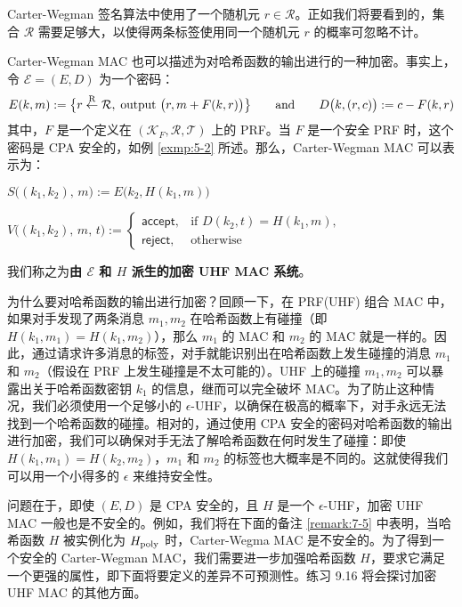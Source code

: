 Carter-Wegman 签名算法中使用了一个随机元 $r\in\mathcal{R}$。正如我们将要看到的，集合 $\mathcal{R}$ 需要足够大，以使得两条标签使用同一个随机元 $r$ 的概率可忽略不计。

\begin{snote}
Carter-Wegman MAC 也可以描述为对哈希函数的输出进行的一种加密。事实上，令 $\mathcal{E}=(E,D)$ 为一个密码：
\[
E(k,m):=\big\{r\overset{\rm R}\leftarrow\mathcal{R},\;\text{output }\big(r,m+F(k,r)\big)\big\}
\quad\quad\text{and}\quad\quad
D\big(k,(r,c)\big):=c-F(k,r)
\]
其中，$F$ 是一个定义在 $(\mathcal{K}_F,\mathcal{R},\mathcal{T})$ 上的 PRF。当 $F$ 是一个安全 PRF 时，这个密码是 CPA 安全的，如例 \ref{exmp:5-2} 所述。那么，Carter-Wegman MAC 可以表示为：

\vspace{5pt}

\hspace*{5pt} $S\big((k_1,k_2),\,m\big):=E\big(k_2,H(k_1,m)\big)$

\vspace{5pt}

\hspace*{5pt} $
V\big((k_1,k_2),\,m,\,t\big):=\left\{
\begin{array}{ll}
\mathsf{accept}, & \text{if }D(k_2,t)=H(k_1,m),\\
\mathsf{reject}, & \text{otherwise}
\end{array}
\right.
$

\vspace{8pt}

\noindent
我们称之为\textbf{由 $\mathcal{E}$ 和 $H$ 派生的加密 UHF MAC 系统}。

为什么要对哈希函数的输出进行加密？回顾一下，在 PRF(UHF) 组合 MAC 中，如果对手发现了两条消息 $m_1,m_2$ 在哈希函数上有碰撞（即 $H(k_1,m_1)=H(k_1,m_2)$），那么 $m_1$ 的 MAC 和 $m_2$ 的 MAC 就是一样的。因此，通过请求许多消息的标签，对手就能识别出在哈希函数上发生碰撞的消息 $m_1$ 和 $m_2$（假设在 PRF 上发生碰撞是不太可能的）。UHF 上的碰撞 $m_1,m_2$ 可以暴露出关于哈希函数密钥 $k_1$ 的信息，继而可以完全破坏 MAC。为了防止这种情况，我们必须使用一个足够小的 $\epsilon$-UHF，以确保在极高的概率下，对手永远无法找到一个哈希函数的碰撞。相对的，通过使用 CPA 安全的密码对哈希函数的输出进行加密，我们可以确保对手无法了解哈希函数在何时发生了碰撞：即使 $H(k_1,m_1)=H(k_2,m_2)$，$m_1$ 和 $m_2$ 的标签也大概率是不同的。这就使得我们可以用一个小得多的 $\epsilon$ 来维持安全性。

问题在于，即使 $(E,D)$ 是 CPA 安全的，且 $H$ 是一个 $\epsilon$-UHF，加密 UHF MAC 一般也是不安全的。例如，我们将在下面的备注 \ref{remark:7-5} 中表明，当哈希函数 $H$ 被实例化为 $H_{\rm poly}$ 时，Carter-Wegma MAC 是不安全的。为了得到一个安全的 Carter-Wegman MAC，我们需要进一步加强哈希函数 $H$，要求它满足一个更强的属性，即下面将要定义的差异不可预测性。练习 9.16 将会探讨加密 UHF MAC 的其他方面。
\end{snote}

